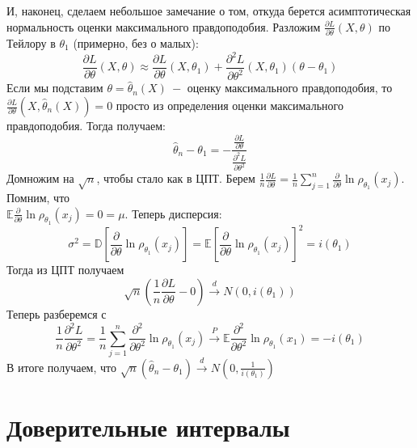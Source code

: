 \begin{remark}
И, наконец, сделаем небольшое замечание о том, откуда берется асимптотическая нормальность оценки максимального правдоподобия. Разложим $\frac{\partial L}{\partial \theta}\left(X, \theta\right)$ по Тейлору в $\theta_1$ (примерно, без о малых):
\[
    \frac{\partial L}{\partial \theta}\left(X, \theta\right) \approx \frac{\partial L}{\partial \theta}\left(X, \theta_1\right) + \frac{\partial ^ 2 L}{\partial \theta ^ 2}\left(X, \theta_1\right)\left(\theta - \theta_1\right)
\]
Если мы подставим $\theta = \widehat{\theta}_n\left(X\right) \ - $ оценку максимального правдоподобия, то $\frac{\partial L}{\partial \theta}\left(X, \widehat{\theta}_n\left(X\right)\right) = 0$ просто из определения оценки максимального правдоподобия. Тогда получаем:
\[
    \widehat{\theta}_n - \theta_1 = -\frac{\frac{\partial L}{\partial \theta}}{\frac{\partial ^ 2 L}{\partial \theta ^ 2}}
\]
Домножим на $\sqrt{n}$, чтобы стало как в ЦПТ. Берем $\frac 1 n \frac{\partial L}{\partial \theta} = \frac 1 n \sum_{j = 1}^{n} \frac{\partial}{\partial \theta} \ln \rho_{\theta_1}\left(x_j\right)$. Помним, что \\ $\mathbb{E} \frac{\partial}{\partial \theta} \ln \rho_{\theta_1}\left(x_j\right) = 0 = \mu$. Теперь дисперсия: 
\[\sigma ^ 2 = \mathbb{D} \left[\frac{\partial}{\partial \theta} \ln \rho_{\theta_1}\left(x_j\right)\right] = \mathbb{E} \left[\frac{\partial}{\partial \theta} \ln \rho_{\theta_1}\left(x_j\right)\right] ^ 2 = i\left(\theta_1\right)
\]
Тогда из ЦПТ получаем
\[
    \sqrt{n} \left(\frac 1 n\frac{\partial L}{\partial \theta} - 0\right) \xrightarrow{d} N\left(0, i\left(\theta_1\right)\right)
\]
Теперь разберемся с 
\[
    \frac 1 n \frac{\partial ^ 2 L}{\partial \theta ^ 2} = \frac 1 n \sum_{j = 1}^{n} \frac{\partial ^ 2}{\partial \theta ^ 2} \ln \rho_{\theta_1}\left(x_j\right) \xrightarrow{P} \mathbb{E}\frac{\partial ^ 2}{\partial \theta ^ 2} \ln \rho_{\theta_1}\left(x_1\right) = -i\left(\theta_1\right)
\]
В итоге получаем, что $\sqrt{n}\left(\widehat{\theta}_n - \theta_1\right) \xrightarrow{d} N\left(0, \frac 1 {i\left(\theta_1\right)}\right)$
\end{remark}

\clearpage

\section{Доверительные интервалы}

